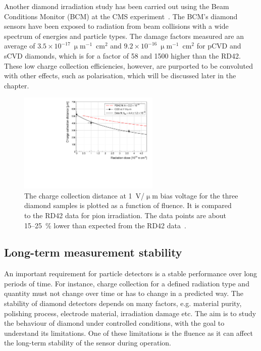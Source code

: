 Another diamond irradiation study has been carried out using the Beam Conditions Monitor (BCM) at the CMS experiment~\cite{Guthoff:1977429}. The BCM's diamond sensors have been exposed to radiation from beam collisions with a wide spectrum of energies and particle types. The damage factors measured are an average of $3.5\times10^{-17}~\upmu$m$^{-1}$~cm$^{2}$ and $9.2\times10^{-16}~\upmu$m$^{-1}$~cm$^{2}$ for pCVD and sCVD diamonds, which is for a factor of 58 and 1500 higher than the RD42. These low charge collection efficiencies, however, are purported to be convoluted with other effects, such as polarisation, which will be discussed later in the chapter.


\begin{figure}[!t]
\centering
\includegraphics[width=0.60\textwidth]{03_measurement_results/scripts/plots/radfactor1}
\caption{The charge collection distance at 1~V/$\upmu$m bias voltage for the three diamond samples is plotted as a function of fluence. It is compared to the RD42 data for pion irradiation. The data points are about 15--25~\% lower than expected from the RD42 data~\cite{RD42IRRAD:00000}.}
 \label{fig:radfactor}
\end{figure}



\subsection{Long-term measurement stability}
\label{sec:longterm}
An important requirement for particle detectors is a stable performance over long periods of time. For instance, charge collection for a defined radiation type and quantity must not change over time or has to change in a predicted way. The stability of diamond detectors depends on many factors, e.g. material purity, polishing process, electrode material, irradiation damage etc. The aim is to study the behaviour of diamond under controlled conditions, with the goal to understand its limitations. One of these limitations is the fluence as it can affect the long-term stability of the sensor during operation. 

